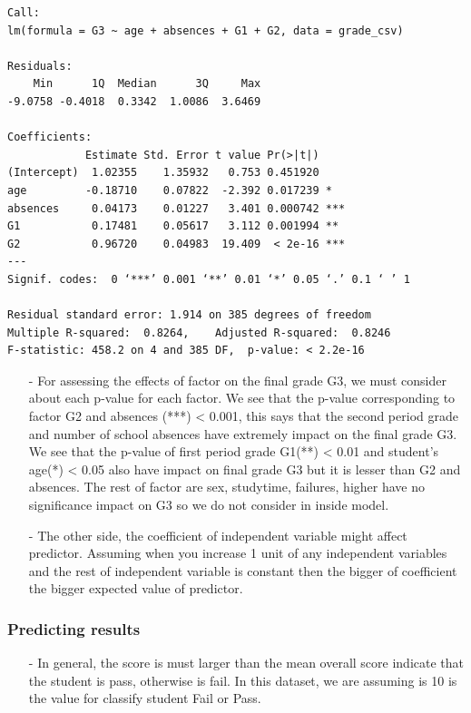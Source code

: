\documentclass[a4paper]{article}
\numberwithin{equation}{section}
\begin{document}
\begin{mdframed}[leftline=false,rightline=false,backgroundcolor=teal!10,nobreak=true]
  \begin{verbatim}
Call:
lm(formula = G3 ~ age + absences + G1 + G2, data = grade_csv)

Residuals:
    Min      1Q  Median      3Q     Max
-9.0758 -0.4018  0.3342  1.0086  3.6469

Coefficients:
            Estimate Std. Error t value Pr(>|t|)
(Intercept)  1.02355    1.35932   0.753 0.451920
age         -0.18710    0.07822  -2.392 0.017239 *
absences     0.04173    0.01227   3.401 0.000742 ***
G1           0.17481    0.05617   3.112 0.001994 **
G2           0.96720    0.04983  19.409  < 2e-16 ***
---
Signif. codes:  0 ‘***’ 0.001 ‘**’ 0.01 ‘*’ 0.05 ‘.’ 0.1 ‘ ’ 1

Residual standard error: 1.914 on 385 degrees of freedom
Multiple R-squared:  0.8264,	Adjusted R-squared:  0.8246
F-statistic: 458.2 on 4 and 385 DF,  p-value: < 2.2e-16
  \end{verbatim}
\end{mdframed}

\begin{itemize}
  \item[-] For assessing the effects of factor on the final grade G3, we must consider about each p-value for each factor. We see that the p-value corresponding to factor G2 and absences (***) < 0.001, this says that the second period grade and number of school absences have extremely impact on the final grade G3. We see that the p-value of first period grade G1(**) < 0.01 and student's age(*) < 0.05 also have impact on final grade G3 but it is lesser than G2 and absences. The rest of factor are sex, studytime, failures, higher have no significance impact on G3 so we do not consider in inside model.

  \item[-] The other side, the coefficient of independent variable might affect predictor. Assuming when you increase 1 unit of any independent variables and the rest of independent variable is constant then the bigger of coefficient the bigger expected value of predictor.
\end{itemize}

\newpage

\subsubsection{Predicting results}
\begin{itemize}
  \item[-] In general, the score is must larger than the mean overall score indicate that the student is pass, otherwise is fail. In this dataset, we are assuming is 10 is the value for classify student Fail or Pass.
\end{itemize}
\end{document}
